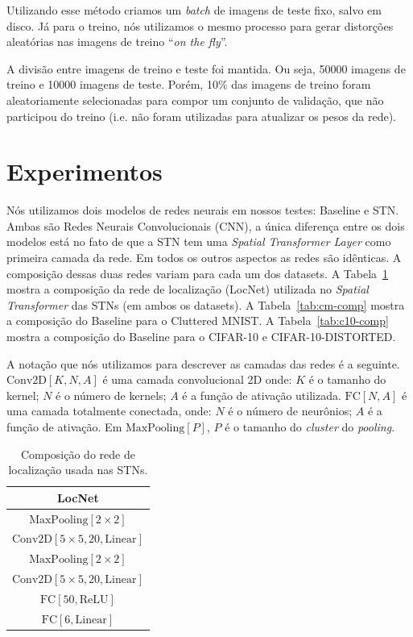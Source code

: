 \documentclass[conference]{IEEEtran}
\begin{document}
Utilizando esse método criamos um \textit{batch} de imagens de teste fixo, salvo em disco. Já para o treino, nós utilizamos o mesmo processo para gerar distorções aleatórias nas imagens de treino ``\textit{on the fly}''.

A divisão entre imagens de treino e teste foi mantida. Ou seja, 50000 imagens de treino e 10000 imagens de teste. Porém, 10\% das imagens de treino foram aleatoriamente selecionadas para compor um conjunto de validação, que não participou do treino (i.e. não foram utilizadas para atualizar os pesos da rede).

\section{Experimentos}

Nós utilizamos dois modelos de redes neurais em nossos testes: Baseline e STN. Ambas são Redes Neurais Convolucionais (CNN), a única diferença entre os dois modelos está no fato de que a STN tem uma \textit{Spatial Transformer Layer} como primeira camada da rede. Em todos os outros aspectos as redes são idênticas. A composição dessas duas redes variam para cada um dos datasets. A Tabela~\ref{tab:locnet-comp} mostra a composição da rede de localização (LocNet) utilizada no \textit{Spatial Transformer} das STNs (em ambos os datasets). A Tabela~\ref{tab:cm-comp} mostra a composição do Baseline para o Cluttered MNIST. A Tabela~\ref{tab:c10-comp} mostra a composição do Baseline para o CIFAR-10 e CIFAR-10-DISTORTED.

A notação que nós utilizamos para descrever as camadas das redes é a seguinte.
$\text{Conv2D}[K, N, A]$ é uma camada convolucional 2D onde: $K$ é o tamanho do kernel; $N$ é o número de kernels; $A$ é a função de ativação utilizada.
$\text{FC}[N, A]$ é uma camada totalmente conectada, onde: $N$ é o número de neurônios; $A$ é a função de ativação.
Em $\text{MaxPooling}[P]$, $P$ é o tamanho do \textit{cluster} do \textit{pooling}.

\begin{table}[!ht]
  \begin{center}
    \begin{tabular}{|c|}
      \hline
      \textbf{LocNet}                              \\ \hline
      $\text{MaxPooling}[2\times2]$                \\ \hline
      $\text{Conv2D}[5\times5, 20, \text{Linear}]$ \\ \hline
      $\text{MaxPooling}[2\times2]$                \\ \hline
      $\text{Conv2D}[5\times5, 20, \text{Linear}]$ \\ \hline
      $\text{FC}[50, \text{ReLU}]$                 \\ \hline
      $\text{FC}[6, \text{Linear}]$                \\ \hline
    \end{tabular}
  \end{center}
  \caption{Composição do rede de localização usada nas STNs.}
  \label{tab:locnet-comp}
\end{table}
\end{document}

